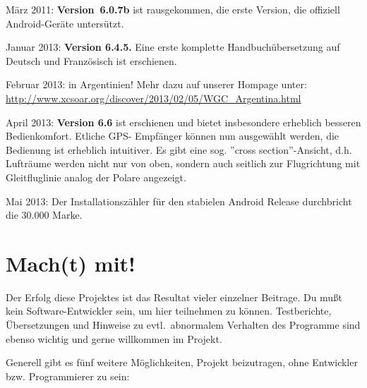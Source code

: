 März 2011: {\bf Version~6.0.7b} ist rausgekommen, die erste Version, die offiziell  Android-Geräte untersützt.

Januar 2013: {\bf Version 6.4.5.} Eine erste komplette Handbuchübersetzung auf Deutsch
und Französisch ist erschienen.

Februar 2013:  in Argentinien! Mehr dazu auf unserer Hompage unter:  \url{http://www.xcsoar.org/discover/2013/02/05/WGC_Argentina.html}

April 2013: {\bf Version 6.6} ist erschienen und bietet insbesondere erheblich besseren Bedienkomfort. Etliche GPS- Empfänger können  nun ausgewählt werden, die Bedienung ist erheblich intuitiver. 
Es gibt eine sog. ''cross section''-Ansicht, d.h. Lufträume werden nicht nur von oben, sondern auch seitlich zur Flugrichtung mit Gleitfluglinie analog der Polare angezeigt.

Mai 2013: Der Installationszähler für den stabielen Android \xc Release durchbricht 
die 30.000 Marke.


\section{Mach(t) mit!}

Der Erfolg diese Projektes ist das Resultat vieler einzelner Beitrage. Du mußt kein Software-Entwickler sein, um hier teilnehmen zu können.
Testberichte, Übersetzungen und Hinweise zu evtl.\ abnormalem Verhalten des Programme sind ebenso wichtig und gerne willkommen
im Projekt.

Generell gibt es fünf weitere Möglichkeiten, Projekt beizutragen, ohne Entwickler bzw. Programmierer zu sein:

